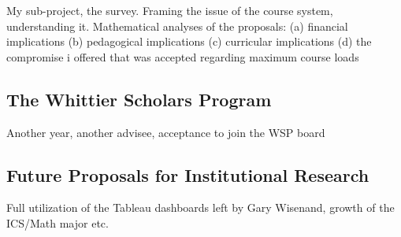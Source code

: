 \documentclass[../../../main.tex]{subfiles}
\begin{document}
My sub-project, the survey.  Framing the issue of the course system, understanding it.  Mathematical analyses of the proposals: (a) financial implications (b) pedagogical implications (c) curricular implications (d) the compromise i offered that was accepted regarding maximum course loads

\subsection{The Whittier Scholars Program}

Another year, another advisee, acceptance to join the WSP board

\subsection{Future Proposals for Institutional Research}

Full utilization of the Tableau dashboards left by Gary Wisenand, growth of the ICS/Math major etc.
\end{document}
